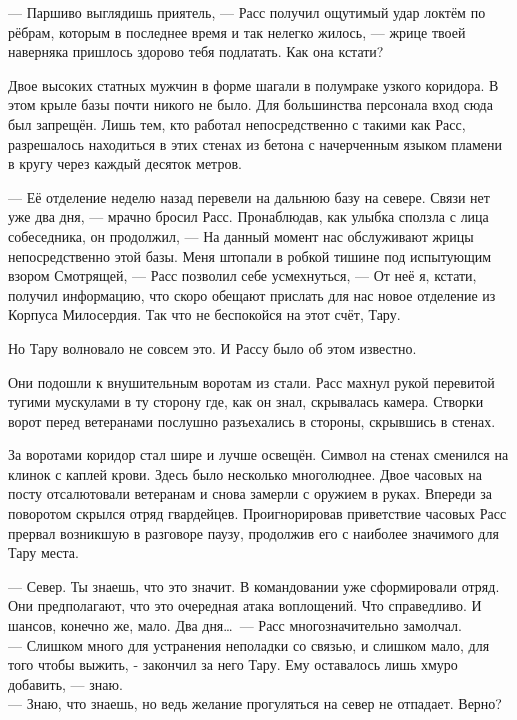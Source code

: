 \noindent --- Паршиво выглядишь приятель, --- Расс получил ощутимый удар локтём 
по рёбрам, которым в последнее время и так нелегко жилось, --- жрице твоей 
наверняка пришлось здорово тебя подлатать. Как она кстати?

Двое высоких статных мужчин в форме шагали в полумраке узкого коридора. В этом 
крыле базы почти никого не было. Для большинства персонала вход сюда был 
запрещён. Лишь тем, кто работал непосредственно с такими как Расс, разрешалось 
находиться в этих стенах из бетона с начерченным языком пламени в кругу через 
каждый десяток метров.

\noindent --- Её отделение неделю назад перевели на дальнюю базу на севере. 
Связи нет уже два дня, --- мрачно бросил Расс. Пронаблюдав, как улыбка сползла с 
лица собеседника, он продолжил, --- На данный момент нас обслуживают жрицы 
непосредственно этой базы. Меня штопали в робкой тишине под испытующим взором 
Смотрящей, --- Расс позволил себе усмехнуться, --- От неё я, кстати, получил 
информацию, что скоро обещают прислать для нас новое отделение из Корпуса 
Милосердия. Так что не беспокойся на этот счёт, Тару.
    
Но Тару волновало не совсем это. И Рассу было об этом известно.

Они подошли к внушительным воротам из стали. Расс махнул рукой перевитой тугими 
мускулами в ту сторону где, как он знал, скрывалась камера. Створки ворот перед 
ветеранами послушно разъехались в стороны, скрывшись в стенах.

За воротами коридор стал шире и лучше освещён. Символ на стенах сменился на 
клинок с каплей крови. Здесь было несколько многолюднее. Двое часовых на посту 
отсалютовали ветеранам и снова замерли с оружием в руках. Впереди за поворотом 
скрылся отряд гвардейцев. Проигнорировав приветствие часовых Расс прервал 
возникшую в разговоре паузу, продолжив его с наиболее значимого для Тару места.

\noindent --- Север. Ты знаешь, что это значит. В командовании уже сформировали 
отряд. Они предполагают, что это очередная атака воплощений. Что справедливо. И 
шансов, конечно же, мало. Два дня\ldots\ --- Расс многозначительно замолчал.\\
--- Слишком много для устранения неполадки со связью, и слишком мало, для того 
чтобы выжить, - закончил за него Тару. Ему оставалось лишь хмуро добавить, --- 
знаю. \\
--- Знаю, что знаешь, но ведь желание прогуляться на север не отпадает. Верно?
    
